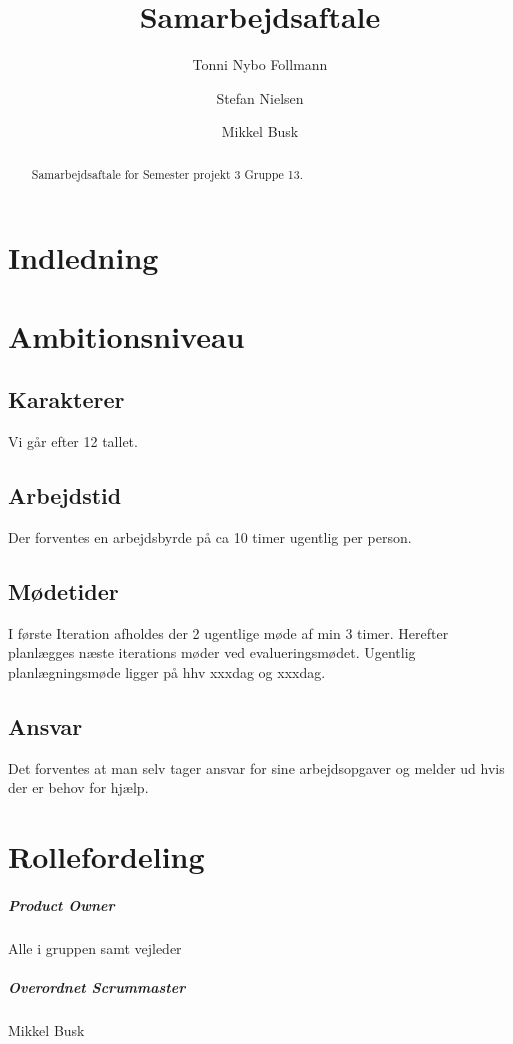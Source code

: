 \documentclass[a4paper,article,11pt,oneside]{memoir}
\title{Samarbejdsaftale}
\author{Tonni Nybo Follmann \and Stefan Nielsen \and Mikkel Busk}
\begin{document}
\maketitle

\begin{abstract}
Samarbejdsaftale for Semester projekt 3 Gruppe 13.
\end{abstract}


\frontmatter
\tableofcontents


\mainmatter
\chapter{Indledning}

\chapter{Ambitionsniveau}

\section{Karakterer}
Vi går efter 12 tallet.
\section{Arbejdstid}
Der forventes en arbejdsbyrde på ca 10 timer ugentlig per person.
\section{Mødetider}
I første Iteration afholdes der 2 ugentlige møde af min 3  timer. Herefter planlægges næste iterations møder ved evalueringsmødet.
Ugentlig planlægningsmøde ligger på hhv xxxdag og xxxdag.

\section{Ansvar}
Det forventes at man selv tager ansvar for sine arbejdsopgaver og melder ud hvis der er behov for hjælp.
\chapter{Rollefordeling}
\paragraph{Product Owner}
Alle i gruppen samt vejleder
\paragraph*{Overordnet Scrummaster} Mikkel Busk
\end{document}
